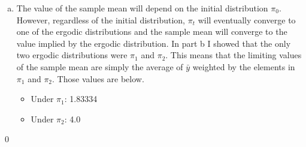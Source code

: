 \documentclass{homework}
\begin{document}
\begin{homeworkProblem}[Problem 2.14]
{\begin{enumerate}[a.]
      \item The value of the sample mean will depend on the initial distribution $\pi_0$. However, regardless of the initial distribution, $\pi_t$ will eventually converge to one of the ergodic distributions and the sample mean will converge to the value implied by the ergodic distribution. In part b I showed that the only two ergodic distributions were $\pi_1$ and $\pi_2$. This means that the limiting values of the sample mean are simply the average of $\bar{y}$ weighted by the elements in $\pi_1$ and $\pi_2$. Those values are below.
      \begin{itemize}
        \item Under $\pi_1$: 1.83334
        \item Under $\pi_2$: 4.0
      \end{itemize}
    \end{enumerate}

    

    \qed

  }
\end{homeworkProblem}
\end{document}
